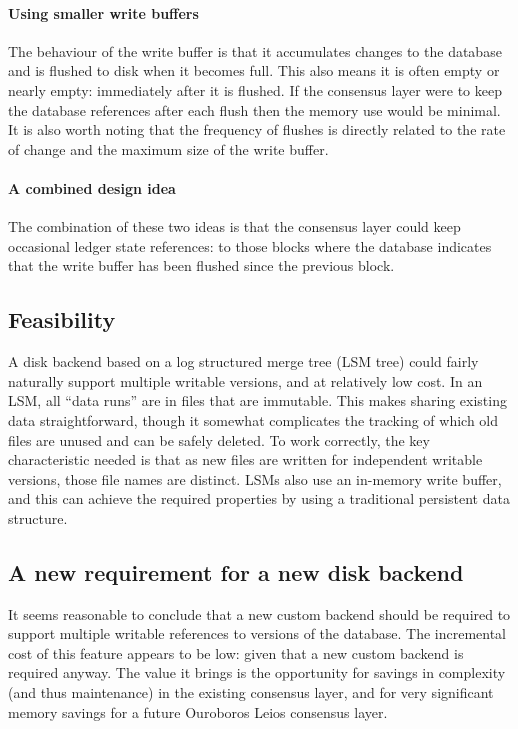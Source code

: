 \documentclass[11pt,a4paper]{article}
\begin{document}
\paragraph{Using smaller write buffers}
The behaviour of the write buffer is that it accumulates changes to the
database and is flushed to disk when it becomes full. This also means it is
often empty or nearly empty: immediately after it is flushed. If the consensus
layer were to keep the database references after each flush then the memory use
would be minimal. It is also worth noting that the frequency of flushes is
directly related to the rate of change and the maximum size of the write buffer.

\paragraph{A combined design idea}
The combination of these two ideas is that the consensus layer could keep
occasional ledger state references: to those blocks where the database
indicates that the write buffer has been flushed since the previous block.

\subsection{Feasibility}

A disk backend based on a log structured merge tree (LSM tree) could fairly
naturally support multiple writable versions, and at relatively low cost. In
an LSM, all ``data runs'' are in files that are immutable. This makes sharing
existing data straightforward, though it somewhat complicates the tracking of
which old files are unused and can be safely deleted. To work correctly, the
key characteristic needed is that as new files are written for independent
writable versions, those file names are distinct. LSMs also use an in-memory
write buffer, and this can achieve the required properties by using a
traditional persistent data structure.

\subsection{A new requirement for a new disk backend}

It seems reasonable to conclude that a new custom backend should be required
to support multiple writable references to versions of the database. The
incremental cost of this feature appears to be low: given that a new custom
backend is required anyway. The value it brings is the opportunity for
savings in complexity (and thus maintenance) in the existing consensus layer,
and for very significant memory savings for a future Ouroboros Leios consensus
layer.
\end{document}
